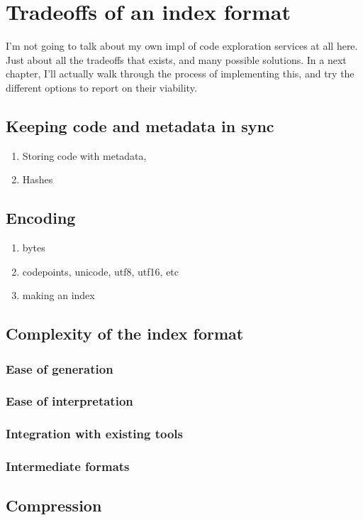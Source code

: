 
\chapter{Tradeoffs of an index format}\label{chap:tradeoffs-of-an-index-format}

I'm not going to talk about my own impl of code exploration services at all here.
Just about all the tradeoffs that exists, and many possible solutions.
In a next chapter, I'll actually walk through the process of implementing this, and
try the different options to report on their viability.


\section{Keeping code and metadata in sync}
\begin{enumerate}
    \item Storing code with metadata,
    \item Hashes
\end{enumerate}
\section{Encoding}
\begin{enumerate}
    \item bytes
    \item codepoints, unicode, utf8, utf16, etc
    \item making an index
\end{enumerate}

\section{Complexity of the index format}
\subsection{Ease of generation}
\subsection{Ease of interpretation}
\subsection{Integration with existing tools}
\subsection{Intermediate formats}

\section{Compression}

